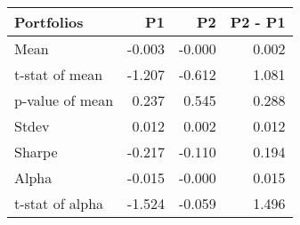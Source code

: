 \begin{tabular}{lrrr}
\toprule
Portfolios & P1 & P2 & P2 - P1 \\
\midrule
Mean & -0.003 & -0.000 & 0.002 \\
t-stat of mean & -1.207 & -0.612 & 1.081 \\
p-value of mean & 0.237 & 0.545 & 0.288 \\
Stdev & 0.012 & 0.002 & 0.012 \\
Sharpe & -0.217 & -0.110 & 0.194 \\
Alpha & -0.015 & -0.000 & 0.015 \\
t-stat of alpha & -1.524 & -0.059 & 1.496 \\
\bottomrule
\end{tabular}
